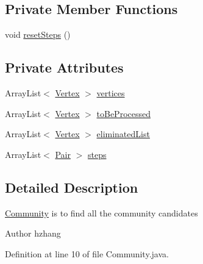 \subsection*{Private Member Functions}
\begin{DoxyCompactItemize}
\item 
void \hyperlink{classmain_1_1java_1_1com_1_1company_1_1dijkstratest_1_1_community_aba69300314e63161ff7e0a3b5aebe2ad}{reset\-Steps} ()
\end{DoxyCompactItemize}
\subsection*{Private Attributes}
\begin{DoxyCompactItemize}
\item 
Array\-List$<$ \hyperlink{classmain_1_1java_1_1com_1_1company_1_1dijkstratest_1_1_vertex}{Vertex} $>$ \hyperlink{classmain_1_1java_1_1com_1_1company_1_1dijkstratest_1_1_community_a00e314391bafea784ad183152dcd6091}{vertices}
\item 
Array\-List$<$ \hyperlink{classmain_1_1java_1_1com_1_1company_1_1dijkstratest_1_1_vertex}{Vertex} $>$ \hyperlink{classmain_1_1java_1_1com_1_1company_1_1dijkstratest_1_1_community_a2ccabf2789253dffe72aa412e7412f7d}{to\-Be\-Processed}
\item 
Array\-List$<$ \hyperlink{classmain_1_1java_1_1com_1_1company_1_1dijkstratest_1_1_vertex}{Vertex} $>$ \hyperlink{classmain_1_1java_1_1com_1_1company_1_1dijkstratest_1_1_community_a580104f4f16e9646bb1c4b3ea36c20a5}{eliminated\-List}
\item 
Array\-List$<$ \hyperlink{classmain_1_1java_1_1com_1_1company_1_1dijkstratest_1_1_pair}{Pair} $>$ \hyperlink{classmain_1_1java_1_1com_1_1company_1_1dijkstratest_1_1_community_adbb6dc448c6e9ffdcd3207b5117e5ac6}{steps}
\end{DoxyCompactItemize}


\subsection{Detailed Description}
\hyperlink{classmain_1_1java_1_1com_1_1company_1_1dijkstratest_1_1_community}{Community} is to find all the community candidates \begin{DoxyAuthor}{Author}
hzhang 
\end{DoxyAuthor}


Definition at line 10 of file Community.\-java.



